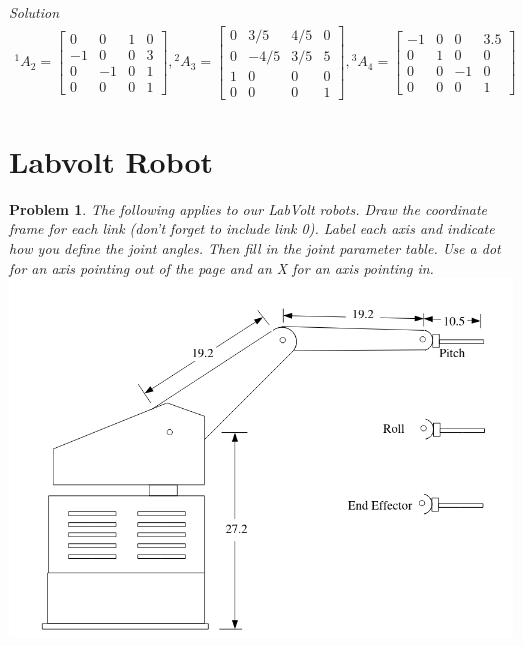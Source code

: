 \documentclass{article}
\newtheorem{prob}{Problem}
\numberwithin{prob}{section}
\newenvironment{solution}{\emph{Solution}}{}
\begin{document}
\begin{solution}
\begin{align}
  {}^1A_2 = \begin{bmatrix}
     0 &  0 &  1 & 0\\
    -1 &  0 &  0 & 3\\
     0 & -1 &  0 & 1\\
     0 &  0 &  0 & 1
  \end{bmatrix}
  ,
  {}^2A_3 = \begin{bmatrix}
     0 & 3/5  & 4/5& 0\\
     0 & -4/5 & 3/5& 5\\
     1 & 0    &  0 & 0\\
     0 & 0    &  0 & 1
  \end{bmatrix}
  ,
  {}^3A_4 = \begin{bmatrix}
     -1 &  0 & 0 & 3.5\\
     0 &  1 &  0 & 0\\
     0 & 0 &  -1 & 0\\
     0 & 0 &  0  & 1
  \end{bmatrix}
\end{align}
\end{solution}

\section{Labvolt Robot}
\begin{prob}
The following applies to our LabVolt robots. Draw the coordinate frame for each link (don’t forget to include link 0). Label each axis and indicate how you define the joint angles. Then fill in the joint
parameter table. Use a dot for an axis pointing out of the page and an X for an axis pointing in.\\
\includegraphics[width=\linewidth]{media/labvolt.png}
\end{prob}
\end{document}
